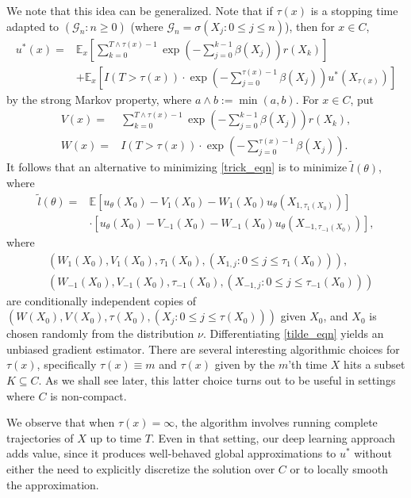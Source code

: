 \documentclass[pdflatex,sn-mathphys-ay]{sn-jnl}%
\numberwithin{equation}{section}
\newcommand\prs[1]{\left(#1\right)}
\newcommand\sbk[1]{\left[#1\right]}
\newcommand{\E}{\mathbb{E}}
\theoremstyle{thmstyleone}%
\theoremstyle{thmstyletwo}%
\theoremstyle{thmstylethree}%
\begin{document}
We note that this idea can be generalized. Note that if $\tau(x)$ is a stopping time adapted to $(\mathcal{G}_n:n\geq0)$ (where $\mathcal{G}_n=\sigma(X_j:0\leq j\leq n)$), then for $x\in C$,
\begin{equation}
\label{generalized_ustar_eqn}
\begin{aligned}
    u^*(x)=&\E_x\sbk{\sum_{k=0}^{T\wedge\tau(x)-1}\exp\prs{-\sum_{j=0}^{k-1}\beta(X_j)}r(X_k)}\\
    &+\E_x\sbk{I(T>\tau(x))\cdot\exp\prs{-\sum_{j=0}^{\tau(x)-1}\beta(X_j)}u^*(X_{\tau(x)})}
\end{aligned}
\end{equation}
by the strong Markov property, where $a\wedge b:=\min(a,b)$. For $x\in C$, put 
\begin{align*}
    V(x)=&\sum_{k=0}^{T\wedge\tau(x)-1}\exp\prs{-\sum_{j=0}^{k-1}\beta(X_j)}r(X_k),\\
    W(x)=&I(T>\tau(x))\cdot\exp\prs{-\sum_{j=0}^{\tau(x)-1}\beta(X_j)}.
\end{align*}
It follows that an alternative to minimizing \eqref{trick_eqn} is to minimize $\tilde{l}(\theta)$, where
\begin{equation}
\label{tilde_eqn}
\begin{aligned}
\tilde{l}(\theta)=&\E\sbk{u_\theta(X_0)-V_1(X_0)-W_1(X_0)u_\theta(X_{1,\tau_1(X_0)})}\\
&\cdot\sbk{u_\theta(X_0)-V_{-1}(X_0)-W_{-1}(X_0)u_\theta(X_{-1,\tau_{-1}(X_0)})},
\end{aligned}
\end{equation}
where
\begin{align*}
    &(W_1(X_0),V_1(X_0),\tau_1(X_0),(X_{1,j}:0\leq j\leq\tau_1(X_0))),\\
    &(W_{-1}(X_0),V_{-1}(X_0),\tau_{-1}(X_0),(X_{-1,j}:0\leq j\leq\tau_{-1}(X_0)))
\end{align*}
are conditionally independent copies of $(W(X_0),V(X_0),\tau(X_0),(X_j:0\leq j\leq\tau(X_0)))$ given $X_0$, and $X_0$ is chosen randomly from the distribution $\nu$. Differentiating \eqref{tilde_eqn} yields an unbiased gradient estimator. There are several interesting algorithmic choices for $\tau(x)$, specifically $\tau(x)\equiv m$ and $\tau(x)$ given by the $m$'th time  $X$ hits a subset $K\subseteq C$. As we shall see later, this latter choice turns out to be useful in settings where $C$ is non-compact.

We observe that when $\tau(x)=\infty$, the algorithm involves running complete trajectories of $X$ up to time $T$. Even in that setting, our deep learning approach adds value, since it produces well-behaved global approximations to $u^*$ without either the need to explicitly discretize the solution over $C$ or to locally smooth the approximation.
\end{document}
